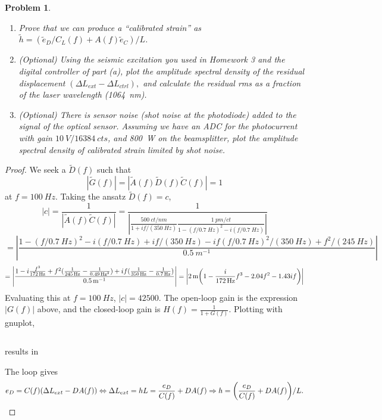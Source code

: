 \documentclass{article}
\newtheorem{plm}{Problem}
\begin{document}
\begin{plm}
\begin{enumerate}
    and plot the open-loop gain and the closed-loop gain for frequencies between \SI{0.1}{Hz} and \SI{1}{kHz}.
  \item Prove that we can produce a ``calibrated strain'' as $\tilde{h} = (\tilde{e}_{D}/C_{L}(f) + A(f)\tilde{e}_{C})/L$.
  \item (Optional) Using the seismic excitation you used in Homework 3 and the digital controller of part (a),
    plot the amplitude spectral density of the residual displacement $(\Delta L_{ext} - \Delta L_{ctrl}),$
    and calculate the residual rms as a fraction of the laser wavelength (\SI{1064}{nm}).
  \item (Optional) There is sensor noise (shot noise at the photodiode) added to the signal of the optical sensor.
    Assuming we have an ADC for the photocurrent with gain $\SI{10}{V}/\SI{16384}{cts}$, and \SI{800}{W} on the beamsplitter,
    plot the amplitude spectral density of calibrated strain limited by shot noise.
  \end{enumerate}
\end{plm}

\begin{proof}
  We seek a $\tilde{D}(f)$ such that
  \[
    |\tilde{G}(f)| = |\tilde{A}(f)\tilde{D}(f)\tilde{C}(f)| = 1
  \]
  at $f = \SI{100}{Hz}$.
  Taking the ansatz $\tilde{D}(f) = c$,
  \[
    |c| = \frac{1}{|\tilde{A}(f)\tilde{C}(f)|} = \frac{1}{\left|\frac{\SI{500}{ct/nm}}{1 + if/(\SI{350}{Hz})}
        \frac{\SI{1}{pm/ct}}{1 - (f/\SI{0.7}{Hz})^{2} - i(f / \SI{0.7}{Hz})}\right|}
  \]
  \[
    = \left|\frac{1 - (f / \SI{0.7}{Hz})^{2} - i(f / \SI{0.7}{Hz}) + if/(\SI{350}{Hz}) - if(f / \SI{0.7}{Hz})^{2}/(\SI{350}{Hz})
        + f^{2}/(\SI{245}{Hz})}{\SI{0.5}{m^{-1}}}\right|
  \]
  \[
    = \left| \frac{1 - i\frac{f^{3}}{\SI{172}{Hz}}+ f^{2}(\frac{1}{\SI{245}{Hz}} - \frac{1}{\SI{0.49}{Hz^{2}}})
      + if(\frac{1}{\SI{350}{Hz}} - \frac{1}{\SI{0.7}{Hz}})}{\SI{0.5}{m^{-1}}} \right|
    = \left| \SI{2}{m}\qty(1 - \frac{i}{\SI{172}{Hz}}f^{3} - {2.04}f^{2} - 1.43if) \right|
  \]
  Evaluating this at $f = \SI{100}{Hz}$, $|c| = 42500$.
  The open-loop gain is the expression $|G(f)|$ above, and the closed-loop gain is $H(f) = \frac{1}{1 + G(f)}$.
  Plotting with gnuplot,
  \begin{center}
    \inputminted{gnuplot}{p2.gp}
  \end{center}
  results in
  \begin{center}
    
  \end{center}

  The loop gives
  \[
    e_{D} = C(f)(\Delta L_{ext} - DA(f))
    \Leftrightarrow \Delta L_{ext} = hL = \frac{e_{D}}{C(f)} + DA(f)
    \Rightarrow h = \qty(\frac{e_{D}}{C(f)} + DA(f)) / L.
  \]
\end{proof}
\end{document}
